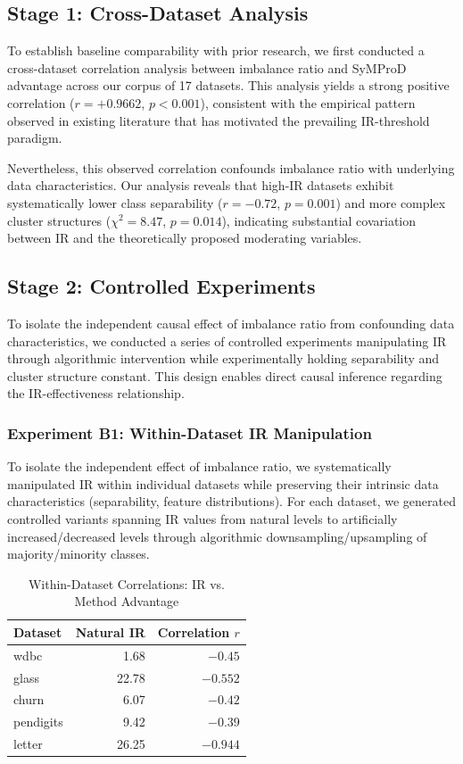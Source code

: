 \documentclass[12pt,a4paper]{article}
\theoremstyle{definition}
\begin{document}
\subsection{Stage 1: Cross-Dataset Analysis}
To establish baseline comparability with prior research, we first conducted a cross-dataset correlation analysis between imbalance ratio and SyMProD advantage across our corpus of 17 datasets. This analysis yields a strong positive correlation ($r = +0.9662$, $p < 0.001$), consistent with the empirical pattern observed in existing literature that has motivated the prevailing IR-threshold paradigm.

Nevertheless, this observed correlation confounds imbalance ratio with underlying data characteristics. Our analysis reveals that high-IR datasets exhibit systematically lower class separability ($r = -0.72$, $p = 0.001$) and more complex cluster structures ($\chi^2 = 8.47$, $p = 0.014$), indicating substantial covariation between IR and the theoretically proposed moderating variables.

\subsection{Stage 2: Controlled Experiments}
To isolate the independent causal effect of imbalance ratio from confounding data characteristics, we conducted a series of controlled experiments manipulating IR through algorithmic intervention while experimentally holding separability and cluster structure constant. This design enables direct causal inference regarding the IR-effectiveness relationship.

\subsubsection{Experiment B1: Within-Dataset IR Manipulation}
To isolate the independent effect of imbalance ratio, we systematically manipulated IR within individual datasets while preserving their intrinsic data characteristics (separability, feature distributions). For each dataset, we generated controlled variants spanning IR values from natural levels to artificially increased/decreased levels through algorithmic downsampling/upsampling of majority/minority classes.

\begin{table}[!ht]
 \centering
 \caption{Within-Dataset Correlations: IR vs. Method Advantage}
 \label{tab:within_dataset}
 \begin{tabular}{lrr}
 \toprule
 Dataset & Natural IR & Correlation $r$ \\
 \midrule
 wdbc & 1.68 & $-0.45$ \\
 glass & 22.78 & $-0.552$ \\
 churn & 6.07 & $-0.42$ \\
 pendigits & 9.42 & $-0.39$ \\
 letter & 26.25 & $-0.944$ \\
 \bottomrule
 \end{tabular}
\end{table}
\end{document}

